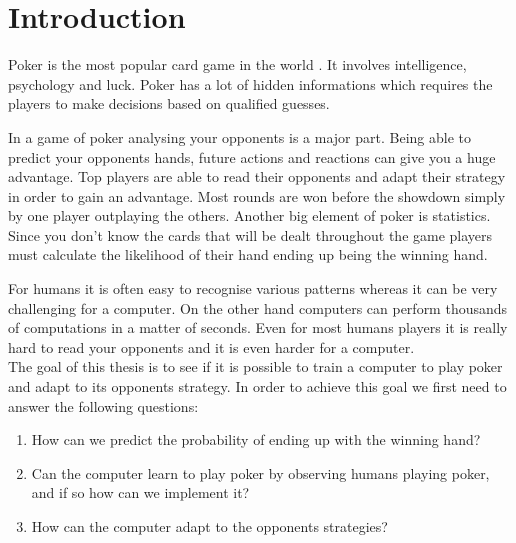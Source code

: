 \section*{Introduction}
Poker is the most popular card game in the world \cite{poker-popular}. It involves intelligence, psychology and luck. Poker has a lot of hidden informations which requires the players to make decisions based on qualified guesses.  

In a game of poker analysing your opponents is a major part. Being able to predict your opponents hands, future actions and reactions can give you a huge advantage. Top players are able to read their opponents and adapt their strategy in order to gain an advantage. Most rounds are won before the showdown simply by one player outplaying the others. Another big element of poker is statistics. Since you don't know the cards that will be dealt throughout the game players must calculate the likelihood of their hand ending up being the winning hand.  

For humans it is often easy to recognise various patterns whereas it can be very challenging for a computer. On the other hand computers can perform thousands of computations in a matter of seconds. Even for most humans players it is really hard to read your opponents and it is even harder for a computer.\\

The goal of this thesis is to see if it is possible to train a computer to play poker and adapt to its opponents strategy. In order to achieve this goal we first need to answer the following questions:

\begin{enumerate}
  \item How can we predict the probability of ending up with the winning hand?
  \item Can the computer learn to play poker by observing humans playing poker, and if so how can we implement it?
  \item How can the computer adapt to the opponents strategies?
\end{enumerate}